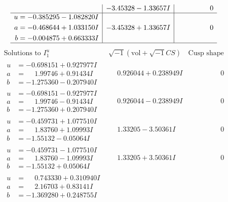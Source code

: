 \documentclass[1p]{elsarticle_modified}
\theoremstyle{definition}
\newcommand{\I}{\sqrt{-1}}
\begin{document}
$$\begin{array}{c|c|c}
 & -3.45328 - 1.33657 I & \phantom{-0.000000 } 0 \\ \hline\begin{aligned}
u &= -0.385295 - 1.082820 I \\
a &= -0.468644 + 1.033150 I \\
b &= -0.004875 + 0.663333 I\end{aligned}
 & -3.45328 + 1.33657 I & \phantom{-0.000000 } 0\\
 \hline 
 \end{array}$$\newpage$$\begin{array}{c|c|c}  
\text{Solutions to }I^u_{1}& \I (\text{vol} + \sqrt{-1}CS) & \text{Cusp shape}\\
 \hline 
\begin{aligned}
u &= -0.698151 + 0.927977 I \\
a &= \phantom{-}1.99746 + 0.91434 I \\
b &= -1.275360 - 0.207940 I\end{aligned}
 & \phantom{-}0.926044 + 0.238949 I & \phantom{-0.000000 } 0 \\ \hline\begin{aligned}
u &= -0.698151 - 0.927977 I \\
a &= \phantom{-}1.99746 - 0.91434 I \\
b &= -1.275360 + 0.207940 I\end{aligned}
 & \phantom{-}0.926044 - 0.238949 I & \phantom{-0.000000 } 0 \\ \hline\begin{aligned}
u &= -0.459731 + 1.077510 I \\
a &= \phantom{-}1.83760 + 1.09993 I \\
b &= -1.55132 - 0.05064 I\end{aligned}
 & \phantom{-}1.33205 - 3.50361 I & \phantom{-0.000000 } 0 \\ \hline\begin{aligned}
u &= -0.459731 - 1.077510 I \\
a &= \phantom{-}1.83760 - 1.09993 I \\
b &= -1.55132 + 0.05064 I\end{aligned}
 & \phantom{-}1.33205 + 3.50361 I & \phantom{-0.000000 } 0 \\ \hline\begin{aligned}
u &= \phantom{-}0.743330 + 0.310940 I \\
a &= \phantom{-}2.16703 + 0.83141 I \\
b &= -1.369280 + 0.248755 I\end{aligned}

\end{array}$$
\end{document}

